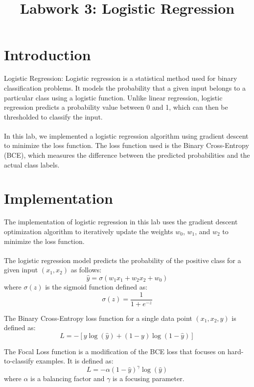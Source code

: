 \documentclass{article}
\title{Labwork 3: Logistic Regression}
\begin{document}
\maketitle

\setlength\parindent{0pt}

\section{Introduction}

Logistic Regression:
Logistic regression is a statistical method used for binary classification problems. It models the 
probability that a given input belongs to a particular class using a logistic function. Unlike linear 
regression, logistic regression predicts a probability value between 0 and 1, which can then be 
thresholded to classify the input.\\
\\
In this lab, we implemented a logistic regression algorithm using gradient descent to minimize the 
loss function. The loss function used is the Binary Cross-Entropy (BCE), which measures the difference 
between the predicted probabilities and the actual class labels.

\section{Implementation}

The implementation of logistic regression in this lab uses the gradient descent optimization algorithm 
to iteratively update the weights $w_0$, $w_1$, and $w_2$ to minimize the loss function.\\
\\
The logistic regression model predicts the probability of the positive class for a given input $(x_1, x_2)$ 
as follows:\\
\[\hat{y} = \sigma(w_1 x_1 + w_2 x_2 + w_0)\]
where $\sigma(z)$ is the sigmoid function defined as:
\[\sigma(z) = \frac{1}{1 + e^{-z}}\]

The Binary Cross-Entropy loss function for a single data point $(x_1, x_2, y)$ is defined as:\\
\[L = -\left[y \log(\hat{y}) + (1 - y) \log(1 - \hat{y})\right]\]

The Focal Loss function is a modification of the BCE loss that focuses on hard-to-classify examples. It is defined as:\\
\[L = -\alpha (1 - \hat{y})^\gamma \log(\hat{y})\]
where $\alpha$ is a balancing factor and $\gamma$ is a focusing parameter.
\end{document}
